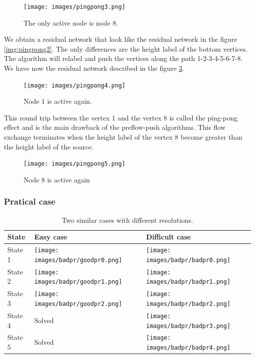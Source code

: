 \begin{figure}[h]
\centering
\texttt{[image: images/pingpong3.png]}
\caption{The only active node is node 8.}
\label{img:pingpong3}
\end{figure}

We obtain a residual network that look like the residual network in the figure \ref{img:pingpong2}. The only differences are the height label of the bottom vertices. The algorithm will relabel and push the vertices along the path 1-2-3-4-5-6-7-8. We have now the residual network described in the figure \ref{img:pingpong5}.
\begin{figure}[h]
\centering
\texttt{[image: images/pingpong4.png]}
\caption{Node 1 is active again.}
\label{img:pingpong4}
\end{figure}

This round trip between the vertex 1 and the vertex 8 is called the ping-pong effect and is the main drawback of the preflow-push algorithms. This flow exchange terminates when the height label of the vertex 8 become greater than the height label of the source.


\begin{figure}[h]
\centering
\texttt{[image: images/pingpong5.png]}
\caption{Node 8 is active again}
\label{img:pingpong5}
\end{figure}


\subsubsection{Pratical case}

\begin{table}
\begin{tabular}{|D|C|C|}
   \hline
   State & 
   Easy case & 
   Difficult case \\ \hline
   State 1 &
   \texttt{[image: images/badpr/goodpr0.png]} & 
   \texttt{[image: images/badpr/badpr0.png]} \\
   State 2 &
   \texttt{[image: images/badpr/goodpr1.png]} & 
   \texttt{[image: images/badpr/badpr1.png]} \\
   State 3 &
   \texttt{[image: images/badpr/goodpr2.png]} & 
   \texttt{[image: images/badpr/badpr2.png]} \\
   State 4 &
   Solved & 
   \texttt{[image: images/badpr/badpr3.png]} \\
   State 5 &
   Solved & 
   \texttt{[image: images/badpr/badpr4.png]} \\ 
   \hline
\end{tabular}
\caption{Two similar cases with different resolutions.}
\label{tabl:case}
\end{table}

